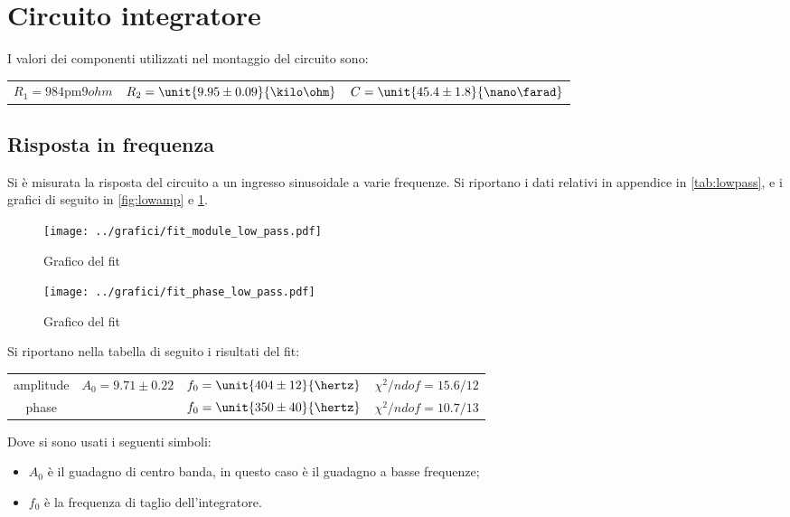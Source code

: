 \documentclass[10pt,a4paper]{article}
\begin{document}
\section{Circuito integratore}

I valori dei componenti utilizzati nel montaggio del circuito sono:

\begin{table}[h!]
\centering
\begin{tabular}{ccc}
$R_1 = \unit{984 \pm 9}{ohm}$	&	$R_2 = \unit{9.95 \pm 0.09}{\kilo\ohm}$	&	$C = \unit{45.4 \pm 1.8}{\nano\farad}$
\end{tabular}
\end{table}

\subsection{Risposta in frequenza}
Si è misurata la risposta del circuito a un ingresso sinusoidale a varie frequenze. Si riportano i dati relativi in appendice in \tablename{\ref{tab:lowpass}}, e i grafici di seguito in \figurename{\ref{fig:lowamp}} e \figurename{\ref{fig:lowph}}.

\begin{figure}[h!]
\centering
	\begin{minipage}[h!]{0.48\textwidth}
		\centering
		\texttt{[image: ../grafici/fit\_module\_low\_pass.pdf]}
		\caption{Grafico del fit }
		\label{fig:lowamp}
	\end{minipage}
	\begin{minipage}[h!]{0.48\textwidth}
		\centering
		\texttt{[image: ../grafici/fit\_phase\_low\_pass.pdf]}
		\caption{Grafico del fit }
		\label{fig:lowph}
	\end{minipage}
\end{figure}

Si riportano nella tabella di seguito i risultati del fit:

\begin{table}[h!]
\centering
\begin{tabular}{c|ccc}
amplitude	&	$A_0 = 9.71 \pm 0.22$	&	$f_0 = \unit{404 \pm 12}{\hertz}$	&	$\chi^2/ndof = 15.6 / 12$\\
phase		& &	$f_0 = \unit{350 \pm 40}{\hertz}$	&	$\chi^2/ndof = 10.7 / 13$
\end{tabular}
\end{table}

\noindent Dove si sono usati i seguenti simboli:
\begin{itemize}
\item $A_0$ è il guadagno di centro banda, in questo caso è il guadagno a basse frequenze;
\item $f_0$ è la frequenza di taglio dell'integratore.
\end{itemize}
\end{document}
